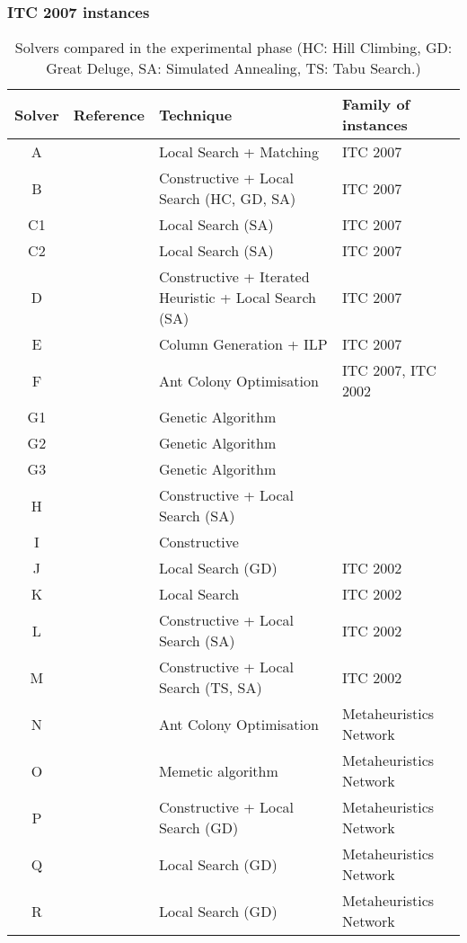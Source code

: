 \documentclass[authoryear,preprint,a4paper,12pt]{elsarticle}
\begin{document}
\subsubsection{ITC 2007 instances}

\begin{sidewaystable}
\footnotesize
\begin{tabular}{|c|l|l|l|}\hline
Solver & Reference & Technique & Family of instances \\ \hline
A & \citet{ChFH08} & Local Search + Matching  & ITC 2007 \\
B & \citet{Mull09} &Constructive + Local Search (HC, GD, SA) & ITC 2007\\
C1 & \citet{CHOP10}& Local Search (SA) & ITC 2007 \\
C2 & \citet{CHOP10}& Local Search (SA) & ITC 2007 \\
D & \citet{Lewi10} & Constructive + Iterated Heuristic + Local Search (SA) & ITC 2007 \\
E & \citet{BrHu10} & Column Generation + ILP & ITC 2007 \\
F & \citet{MNCR08}& Ant Colony Optimisation & ITC 2007, ITC 2002 \\
G1 & \citet{LePa07}& Genetic Algorithm & \citeauthor{LePa07} \\
G2 & \citet{LePa07}& Genetic Algorithm & \citeauthor{LePa07} \\
G3 & \citet{LePa07} & Genetic Algorithm & \citeauthor{LePa07} \\
H & \citet{TuBM07} & Constructive + Local Search (SA) & \citeauthor{LePa07} \\
I & \citet{LiZC11} &  Constructive & \citeauthor{LePa07} \\
J & \citet{BBNP03} & Local Search (GD) & ITC 2002 \\
K & \citet{DiSc06} & Local Search & ITC 2002 \\
L & \citet{Kost04} & Constructive + Local Search (SA) & ITC 2002 \\
M & \citet{CBSR06} & Constructive + Local Search (TS, SA) & ITC 2002 \\
N & \citet{SoKS02} & Ant Colony Optimisation & Metaheuristics Network \\
O & \citet{AbBM07b} & Memetic algorithm & Metaheuristics Network\\
P & \citet{McMu07} & Constructive + Local Search (GD) & Metaheuristics Network \\
Q & \citet{LaOb08} & Local Search (GD) & Metaheuristics Network \\
R & \citet{TuSM09} & Local Search (GD) & Metaheuristics Network \\ 
\hline
\end{tabular}
\caption{Solvers compared in the experimental phase (HC: Hill Climbing, GD: Great Deluge, SA: Simulated Annealing, TS: Tabu Search.)}
\label{tab:solvers}
\end{sidewaystable}
\end{document}
